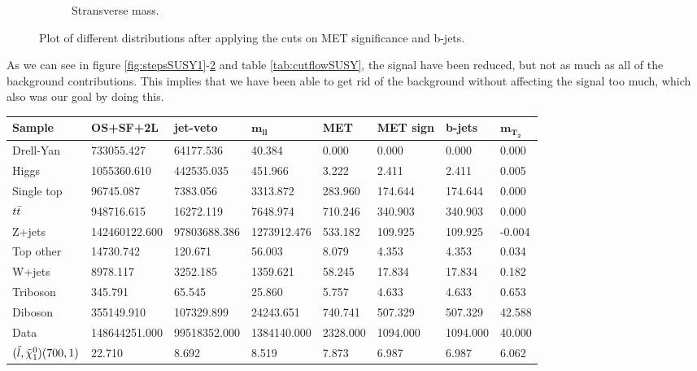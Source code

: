\begin{figure}[H]
\begin{subfigure}[t!]{0.49\textwidth}
    \caption{Stransverse mass.}
    \label{fig:mt2SUSY}
    \end{subfigure}
    \caption{Plot of different distributions after applying the cuts on MET significance and b-jets.}
    \label{fig:stepsSUSY3}
\end{figure}

As we can see in figure \ref{fig:stepsSUSY1}-\ref{fig:stepsSUSY3} and table \ref{tab:cutflowSUSY}, the signal have been reduced, but not as much as all of the background contributions. This implies that we have been able to get rid of the background without affecting the signal too much, which also was our goal by doing this. 

\begin{landscape}
\begin{table}[H]
    \centering
    \begin{tabular}{l l l l l l l l}
    \toprule
    \textbf{Sample} & \textbf{OS+SF+2L} & \textbf{jet-veto} & $\mathbf{m_{ll}}$ & \textbf{MET} & \textbf{MET sign} & \textbf{b-jets} & $\mathbf{m_{T_2}}$\\
    \midrule
    \midrule
        Drell-Yan & 733055.427 & 64177.536 & 40.384 & 0.000 & 0.000 & 0.000 & 0.000 \\
        Higgs & 1055360.610 & 442535.035 & 451.966 & 3.222 & 2.411 & 2.411 & 0.005\\
        Single top & 96745.087 & 7383.056 & 3313.872 & 283.960 & 174.644 & 174.644 & 0.000\\
        $t\Bar{t}$ & 948716.615 & 16272.119 & 7648.974 & 710.246 & 340.903 & 340.903 & 0.000\\
        Z+jets & 142460122.600 & 97803688.386 & 1273912.476 & 533.182 & 109.925 & 109.925 & -0.004\\
        Top other & 14730.742 & 120.671 & 56.003 & 8.079 & 4.353 & 4.353 & 0.034\\
        W+jets & 8978.117 & 3252.185 & 1359.621 & 58.245 & 17.834 & 17.834 & 0.182\\
        Triboson & 345.791 & 65.545 & 25.860 & 5.757 & 4.633 & 4.633 & 0.653\\
        Diboson & 355149.910 & 107329.899 & 24243.651 & 740.741 & 507.329 & 507.329 & 42.588\\
        Data & 148644251.000 & 99518352.000 & 1384140.000 & 2328.000 & 1094.000 & 1094.000 & 40.000\\
        $(\Tilde{l}, \Tilde{\chi}_1^0) (700,1)$ & 22.710 & 8.692 & 8.519 & 7.873 & 6.987 & 6.987 & 6.062\\

\end{tabular}
\end{table}
\end{landscape}
